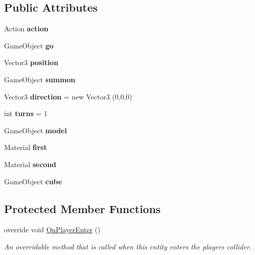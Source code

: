\subsection*{Public Attributes}
\begin{DoxyCompactItemize}
\item 
\mbox{\label{class_pressure_plate_a6302d6e94bcbbd31fa55d0bca006ffa5}} 
Action {\bfseries action}
\item 
\mbox{\label{class_pressure_plate_aead725b8d1478d5267fde196672bb597}} 
Game\+Object {\bfseries go}
\item 
\mbox{\label{class_pressure_plate_a982e3da6624dcf693847ba3b39a30f8a}} 
Vector3 {\bfseries position}
\item 
\mbox{\label{class_pressure_plate_a5003ad0f7a2689312dad2a0627159fa5}} 
Game\+Object {\bfseries summon}
\item 
\mbox{\label{class_pressure_plate_a59ec5355f5fc1f4524c2aae0722a919e}} 
Vector3 {\bfseries direction} = new Vector3 (0,0,0)
\item 
\mbox{\label{class_pressure_plate_a6db48f1e01aa9d689e3f4fe2602fce1c}} 
int {\bfseries turns} = 1
\item 
\mbox{\label{class_pressure_plate_a90894937e168bf3b9780be0d9a4aa11b}} 
Game\+Object {\bfseries model}
\item 
\mbox{\label{class_pressure_plate_ae1dbd6e5d02d4be800b45f320a592b76}} 
Material {\bfseries first}
\item 
\mbox{\label{class_pressure_plate_a7371406aa95f86f24a88a48bbb2a6a2b}} 
Material {\bfseries second}
\item 
\mbox{\label{class_pressure_plate_a8bfd1f62ab738ccfc8f57bafb6c5c1fd}} 
Game\+Object {\bfseries cube}
\end{DoxyCompactItemize}
\subsection*{Protected Member Functions}
\begin{DoxyCompactItemize}
\item 
override void \mbox{\hyperlink{class_pressure_plate_a859fa0ce4d9dcfdcc702593ae98afbb0}{On\+Player\+Enter}} ()
\begin{DoxyCompactList}\small\item\em An overridable method that is called when this entity enters the player\textquotesingle{}s collider. \end{DoxyCompactList}\end{DoxyCompactItemize}


